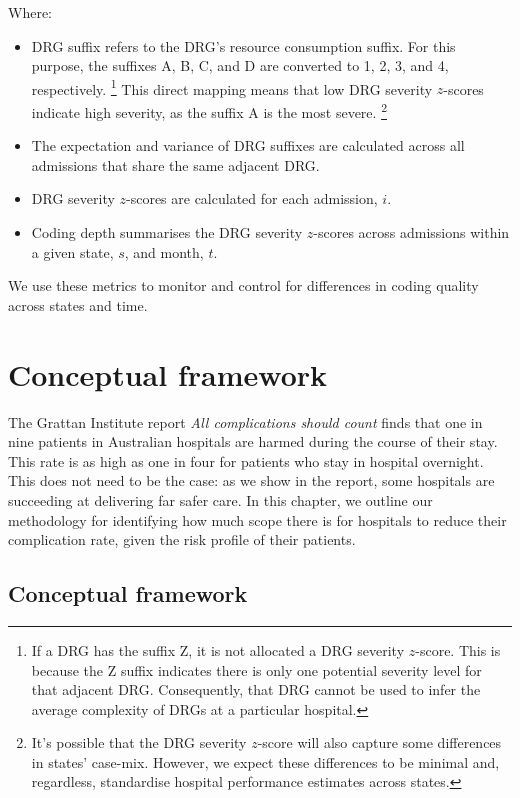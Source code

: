\documentclass[submission]{grattan}
\newcommand*{\myTitle}{All complications should count}
\begin{document}
Where:


\begin{itemize}
\item
  DRG suffix refers to the DRG's resource consumption suffix.
For this purpose, the suffixes A, B, C, and D are converted to 1, 2, 3, and 4, respectively.%
	\footnote{If a DRG has the suffix Z, it is not allocated a DRG severity \(z\)-score.
	This is because the Z suffix indicates there is only one potential severity level for that adjacent DRG\@.
	Consequently, that DRG cannot be used to infer the average complexity of DRGs at a particular hospital.}
This direct mapping means that low DRG severity \(z\)-scores indicate high severity, as the suffix A is the most severe.%
	\footnote{It's possible that the DRG severity \(z\)-score will also capture some differences in states' case-mix.
	However, we expect these differences to be minimal and, regardless, standardise hospital performance estimates across states.}
\item
  The expectation and variance of DRG suffixes are calculated across all admissions that share the same adjacent DRG.
\item
  DRG severity \(z\)-scores are calculated for each admission, \(i\).
\item
  Coding depth summarises the DRG severity \(z\)-scores across admissions within a given state, \(s\), and month, \(t\).
\end{itemize}

We use these metrics to monitor and control for differences in coding quality across states and time.

\chapter{Conceptual framework}\label{chap:conceptual-framework}

The Grattan Institute report \textit{\myTitle} finds that one in nine patients in Australian hospitals are harmed during the course of their stay.
This rate is as high as one in four for patients who stay in hospital overnight.
This does not need to be the case: as we show in the report, some hospitals are succeeding at delivering far safer care.
In this chapter, we outline our methodology for identifying how much scope there is for hospitals to reduce their complication rate, given the risk profile of their patients.

\section{Conceptual framework}\label{sec:conceptual-framework-1}
\end{document}
